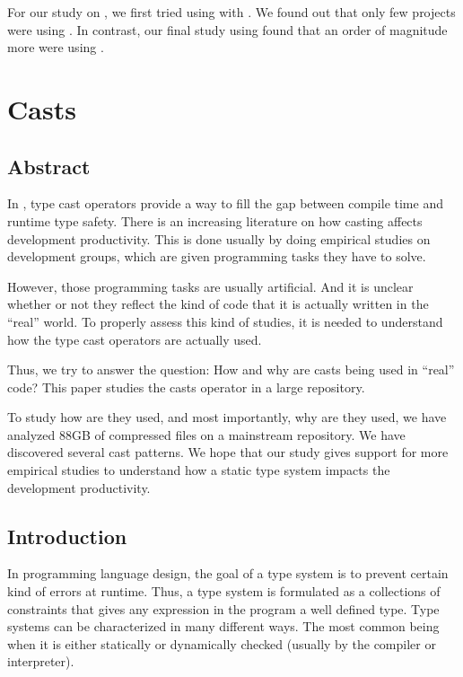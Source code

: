 \documentclass{usiinfdocprop}
\begin{document}
For our study on \smu{}, we first tried using \boa{} with \sourceforge{}.
We found out that only few projects were using \smu{}.
In contrast, our final study using \maven{} found that an order of magnitude more were using \smu{}.

\chapter{Casts \label{org686b6a5}}
\label{sec:orgbdd6f24}
\section{Abstract}
\label{sec:org22d1770}

In \java, type cast operators provide a way to fill the gap between compile time and runtime type safety. 
There is an increasing literature on how casting affects development productivity. 
This is done usually by doing empirical studies on development groups, which are given programming tasks they have to solve. 

However, those programming tasks are usually artificial. 
And it is unclear whether or not they reflect the kind of code that it is actually written in the ``real'' world. 
To properly assess this kind of studies, it is needed to understand how the type cast operators are actually used. 

Thus, we try to answer the question: 
How and why are casts being used in ``real'' \java{} code? 
This paper studies the casts operator in a large \java{} repository. 

To study how are they used, and most importantly, why are they used, we have analyzed 88GB of compressed \jar{} files on a mainstream \java{} repository. 
We have discovered several cast patterns. 
We hope that our study gives support for more empirical studies to understand how a static type system impacts the development productivity.

\section{Introduction}
\label{sec:orgd1d4548}
In programming language design, the goal of a type system is to prevent certain kind of errors at runtime. 
Thus, a type system is formulated as a collections of constraints that gives any expression in the program a well defined type. 
Type systems can be characterized in many different ways. 
The most common being when it is either statically or dynamically checked (usually by the compiler or interpreter). 
\end{document}
